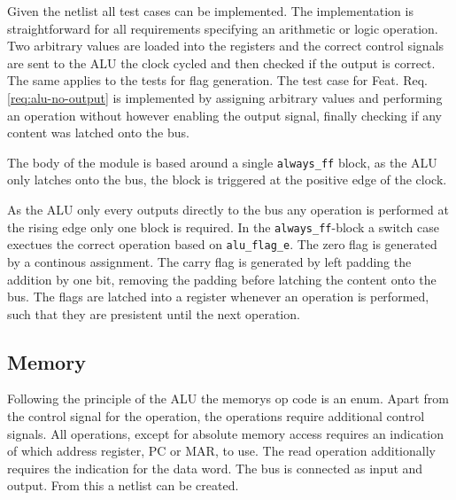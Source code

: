 Given the netlist all test cases can be implemented. The implementation is straightforward for all requirements specifying an arithmetic or logic operation. Two arbitrary values are loaded into the registers and the correct control signals are sent to the ALU the clock cycled and then checked if the output is correct. The same applies to the tests for flag generation. The test case for Feat. Req. \ref{req:alu-no-output} is implemented by assigning arbitrary values and performing an operation without however enabling the output signal, finally checking if any content was latched onto the bus.  

The body of the module is based around a single \texttt{always\_ff} block, as the ALU only latches onto the bus, the block is triggered at the positive edge of the clock. 

As the ALU only every outputs directly to the bus any operation is performed at the rising edge only one block is required. In the \texttt{always\_ff}-block a switch case exectues the correct operation based on \texttt{alu\_flag\_e}. The zero flag is generated by a continous assignment. The carry flag is generated by left padding the addition by one bit, removing the padding before latching the content onto the bus. The flags are latched into a register whenever an operation is performed, such that they are presistent until the next operation.


% 

\subsection{Memory}

Following the principle of the ALU the memorys op code is an enum. Apart from the control signal for the operation, the operations require additional control signals. All operations, except for absolute memory access requires an indication of which address register, PC or MAR, to use. The read operation additionally requires the indication for the data word. The bus is connected as input and output. From this a netlist can be created.


